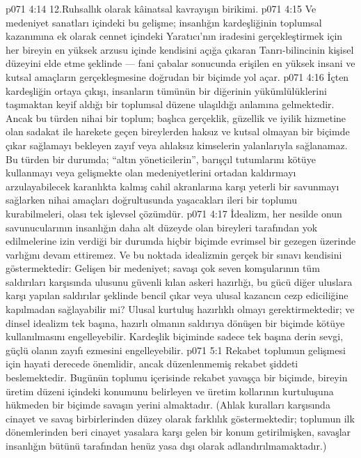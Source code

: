 \vs p071 4:14 12.\bibnobreakspace Ruhsallık olarak kâinatsal kavrayışın birikimi.
\vs p071 4:15 Ve medeniyet sanatları içindeki bu gelişme; insanlığın kardeşliğinin toplumsal kazanımına ek olarak cennet içindeki Yaratıcı’nın iradesini gerçekleştirmek için her bireyin en yüksek arzusu içinde kendisini açığa çıkaran Tanrı\hyp{}bilincinin kişisel düzeyini elde etme şeklinde --- fani çabalar sonucunda erişilen en yüksek insani ve kutsal amaçların gerçekleşmesine doğrudan bir biçimde yol açar.
\vs p071 4:16 İçten kardeşliğin ortaya çıkışı, insanların tümünün bir diğerinin yükümlülüklerini taşımaktan keyif aldığı bir toplumsal düzene ulaşıldığı anlamına gelmektedir. Ancak bu türden nihai bir toplum; başlıca gerçeklik, güzellik ve iyilik hizmetine olan sadakat ile harekete geçen bireylerden haksız ve kutsal olmayan bir biçimde çıkar sağlamayı bekleyen zayıf veya ahlaksız kimselerin yalanlarıyla sağlanamaz. Bu türden bir durumda; “altın yöneticilerin”, barışçıl tutumlarını kötüye kullanmayı veya gelişmekte olan medeniyetlerini ortadan kaldırmayı arzulayabilecek karanlıkta kalmış cahil akranlarına karşı yeterli bir savunmayı sağlarken nihai amaçları doğrultusunda yaşacakları ileri bir toplumu kurabilmeleri, olası tek işlevsel çözümdür.
\vs p071 4:17 İdealizm, her nesilde onun savunucularının insanlığın daha alt düzeyde olan bireyleri tarafından yok edilmelerine izin verdiği bir durumda hiçbir biçimde evrimsel bir gezegen üzerinde varlığını devam ettiremez. Ve bu noktada idealizmin gerçek bir sınavı kendisini göstermektedir: Gelişen bir medeniyet; savaşı çok seven komşularının tüm saldırıları karşısında ulusunu güvenli kılan askeri hazırlığı, bu gücü diğer uluslara karşı yapılan saldırılar şeklinde bencil çıkar veya ulusal kazancın cezp ediciliğine kapılmadan sağlayabilir mi? Ulusal kurtuluş hazırlıklı olmayı gerektirmektedir; ve dinsel idealizm tek başına, hazırlı olmanın saldırıya dönüşen bir biçimde kötüye kullanılmasını engelleyebilir. Kardeşlik biçiminde sadece tek başına derin sevgi, güçlü olanın zayıfı ezmesini engelleyebilir.
\vs p071 5:1 Rekabet toplumun gelişmesi için hayati derecede önemlidir, ancak düzenlenmemiş rekabet şiddeti beslemektedir. Bugünün toplumu içerisinde rekabet yavaşça bir biçimde, bireyin üretim düzeni içindeki konumunu belirleyen ve üretim kollarının kurtuluşuna hükmeden bir biçimde savaşın yerini almaktadır. (Ahlak kuralları karşısında cinayet ve savaş birbirlerinden düzey olarak farklılık göstermektedir; toplumun ilk dönemlerinden beri cinayet yasalara karşı gelen bir konum getirilmişken, savaşlar insanlığın bütünü tarafından henüz yasa dışı olarak adlandırılmamaktadır.)
